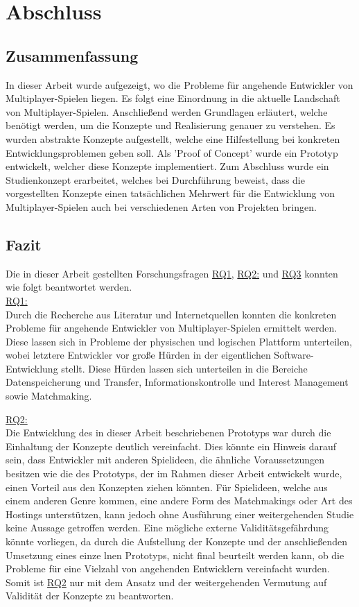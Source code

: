 \chapter{Abschluss}
\label{sec:abschluss}

\section{Zusammenfassung}

In dieser Arbeit wurde aufgezeigt, wo die Probleme für angehende Entwickler von Multiplayer-Spielen liegen. Es folgt eine Einordnung in die aktuelle Landschaft von Multiplayer-Spielen. Anschließend werden Grundlagen erläutert, welche benötigt werden, um die Konzepte und Realisierung genauer zu verstehen. Es wurden abstrakte Konzepte aufgestellt, welche eine Hilfestellung bei konkreten Entwicklungsproblemen geben soll. Als 'Proof of Concept' wurde ein Prototyp entwickelt, welcher diese Konzepte implementiert. Zum Abschluss wurde ein Studienkonzept erarbeitet, welches bei Durchführung beweist, dass die vorgestellten Konzepte einen tatsächlichen Mehrwert für die Entwicklung von Multiplayer-Spielen auch bei verschiedenen Arten von Projekten bringen.

\section{Fazit}

Die in dieser Arbeit gestellten Forschungsfragen \hyperref[RQ1]{RQ1}, \hyperref[RQ2]{RQ2:} und \hyperref[RQ3]{RQ3} konnten wie folgt beantwortet werden. \\
\hyperref[RQ1]{RQ1:} \\
Durch die Recherche aus Literatur und Internetquellen konnten die konkreten Probleme für angehende Entwickler von Multiplayer-Spielen ermittelt werden. Diese lassen sich in Probleme der physischen und logischen Plattform unterteilen, wobei letztere Entwickler vor große Hürden in der eigentlichen Software-Entwicklung stellt. Diese Hürden lassen sich unterteilen in die Bereiche Datenspeicherung und Transfer, Informationskontrolle und Interest Management sowie Matchmaking.

\hyperref[RQ2]{RQ2:} \\
Die Entwicklung des in dieser Arbeit beschriebenen Prototyps war durch die Einhaltung der Konzepte deutlich vereinfacht. Dies könnte ein Hinweis darauf sein, dass Entwickler mit anderen Spielideen, die ähnliche Voraussetzungen besitzen wie die des Prototyps, der im Rahmen dieser Arbeit entwickelt wurde, einen Vorteil aus den Konzepten ziehen könnten. Für Spielideen, welche aus einem anderen Genre kommen, eine andere Form des Matchmakings oder Art des Hostings unterstützen, kann jedoch ohne Ausführung einer weitergehenden Studie keine Aussage getroffen werden. Eine mögliche externe Validitätsgefährdung könnte vorliegen, da durch die Aufstellung der Konzepte und der anschließenden Umsetzung eines einze lnen Prototyps, nicht final beurteilt werden kann, ob die Probleme für eine Vielzahl von angehenden Entwicklern vereinfacht wurden. Somit ist \hyperref[RQ2]{RQ2} nur mit dem Ansatz und der weitergehenden Vermutung auf Validität der Konzepte zu beantworten.

